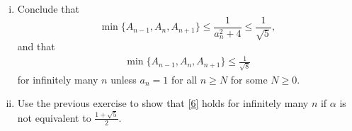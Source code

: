 \documentclass[12pt,a4paper]{article}
\theoremstyle{plain}
\theoremstyle{definition}
\begin{document}
{\begin{enumerate}[i)]
		\item Conclude that 
			\[ \min \{ A_{n-1}, A_n, A_{n+1} \} \leq \frac{1}{a_n^2 + 4} \leq \frac{1}{\sqrt{5}}, \]
		and that
			\begin{gather}
				\min \{ A_{n-1}, A_n, A_{n+1} \} \leq \frac{1}{\sqrt{8}} \label{6}
			\end{gather}
		for infinitely many $n$ unless $a_n =1$ for all $n \geq N$ for some $N \geq 0$.

		\item Use the previous exercise to show that \eqref{6} holds for infinitely many $n$ if $\alpha$ is not equivalent to $ \frac{1+\sqrt{5}}2$.
			
	\end{enumerate}
}
{}
\end{document}
